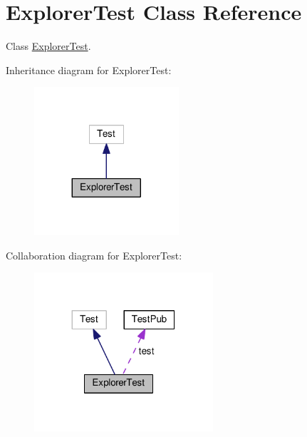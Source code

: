 \hypertarget{classExplorerTest}{}\section{Explorer\+Test Class Reference}
\label{classExplorerTest}


Class \hyperlink{classExplorerTest}{Explorer\+Test}.  




Inheritance diagram for Explorer\+Test\+:
\nopagebreak
\begin{figure}[H]
\begin{center}
\leavevmode
\includegraphics[width=152pt]{classExplorerTest__inherit__graph}
\end{center}
\end{figure}


Collaboration diagram for Explorer\+Test\+:
\nopagebreak
\begin{figure}[H]
\begin{center}
\leavevmode
\includegraphics[width=188pt]{classExplorerTest__coll__graph}
\end{center}
\end{figure}
